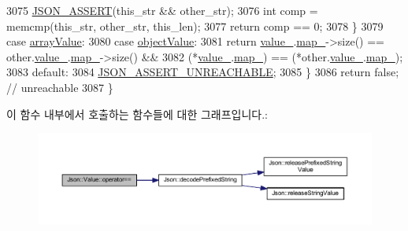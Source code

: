 \begin{DoxyCode}
3075     \hyperlink{json_8h_a188941dcc789ccb6539c3d6f41405582}{JSON\_ASSERT}(this\_str && other\_str);
3076     \textcolor{keywordtype}{int} comp = memcmp(this\_str, other\_str, this\_len);
3077     \textcolor{keywordflow}{return} comp == 0;
3078   \}
3079   \textcolor{keywordflow}{case} \hyperlink{namespace_json_a7d654b75c16a57007925868e38212b4eadc8f264f36b55b063c78126b335415f4}{arrayValue}:
3080   \textcolor{keywordflow}{case} \hyperlink{namespace_json_a7d654b75c16a57007925868e38212b4eae8386dcfc36d1ae897745f7b4f77a1f6}{objectValue}:
3081     \textcolor{keywordflow}{return} \hyperlink{class_json_1_1_value_aef578244546212705b9f81eb84d7e151}{value\_}.\hyperlink{union_json_1_1_value_1_1_value_holder_a1e7a5b86d4f52234f55c847ad1ce389a}{map\_}->size() == other.\hyperlink{class_json_1_1_value_aef578244546212705b9f81eb84d7e151}{value\_}.\hyperlink{union_json_1_1_value_1_1_value_holder_a1e7a5b86d4f52234f55c847ad1ce389a}{map\_}->size() &&
3082            (*\hyperlink{class_json_1_1_value_aef578244546212705b9f81eb84d7e151}{value\_}.\hyperlink{union_json_1_1_value_1_1_value_holder_a1e7a5b86d4f52234f55c847ad1ce389a}{map\_}) == (*other.\hyperlink{class_json_1_1_value_aef578244546212705b9f81eb84d7e151}{value\_}.\hyperlink{union_json_1_1_value_1_1_value_holder_a1e7a5b86d4f52234f55c847ad1ce389a}{map\_});
3083   \textcolor{keywordflow}{default}:
3084     \hyperlink{jsoncpp_8cpp_aa5e619e3e9388f6376a344dd8462c9cc}{JSON\_ASSERT\_UNREACHABLE};
3085   \}
3086   \textcolor{keywordflow}{return} \textcolor{keyword}{false}; \textcolor{comment}{// unreachable}
3087 \}
\end{DoxyCode}
이 함수 내부에서 호출하는 함수들에 대한 그래프입니다.\+:\nopagebreak
\begin{figure}[H]
\begin{center}
\leavevmode
\includegraphics[width=350pt]{class_json_1_1_value_a16f9250e30d5c4505cd11137c564a764_cgraph}
\end{center}
\end{figure}
\mbox{\label{class_json_1_1_value_a4646c2f0764908c0972160c7c2ebe567}} 
